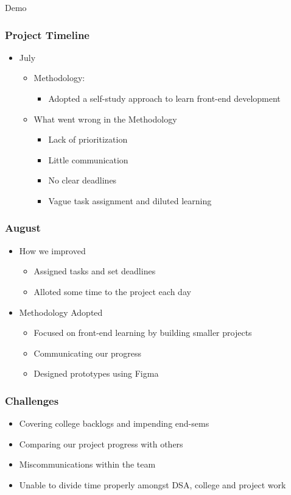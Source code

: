 \documentclass{beamer}
\begin{document}
\begin{frame}
    \center\Huge Demo
\end{frame}

\begin{frame}
\frametitle{Project Timeline}
\begin{itemize}
  \item July
  \begin{itemize}
    \item Methodology:
    \begin{itemize}
      \item Adopted a self-study approach to learn front-end development 
    \end{itemize}
    \item What went wrong in the Methodology
    \begin{itemize}
      \item Lack of prioritization
      \item Little communication
      \item No clear deadlines
      \item Vague task assignment and diluted learning
    \end{itemize}
  \end{itemize}

\end{itemize}
\end{frame}
\begin{frame}
  \frametitle{August}
  \begin{itemize}
    \item How we improved
    \begin{itemize}
      \item Assigned tasks and set deadlines
      \item Alloted some time to the project each day
    \end{itemize}
    \item Methodology Adopted
    \begin{itemize}
      \item Focused on front-end learning by building smaller projects
      \item Communicating our progress
      \item Designed prototypes using Figma
    \end{itemize}
  \end{itemize}
\end{frame}

\begin{frame}
  \frametitle{Challenges}
  \begin{itemize}
    \item Covering college backlogs and impending end-sems
    \item Comparing our project progress with others
    \item Miscommunications within the team
    \item Unable to divide time properly amongst DSA, college and project work
  \end{itemize}
  \end{frame}
\end{document}
